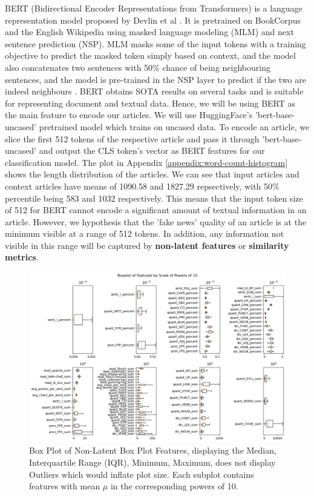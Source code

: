 \documentclass{article}
\begin{document}
\label{section:bert}
BERT (Bidirectional Encoder Representations from Transformers) is a language representation model proposed by Devlin et al \cite{bert}. It is pretrained on BookCorpus and the English Wikipedia using masked language modeling (MLM) and next sentence prediction (NSP). MLM masks some of the input tokens with a training objective to predict the masked token simply based on context, and the model also concatenates two sentences with 50\% chance of being neighbouring sentences, and the model is pre-trained in the NSP layer to predict if the two are indeed neighbours \cite{bert}. BERT obtains SOTA results on several tasks and is suitable for representing document and textual data. Hence, we will be using BERT as the main feature to encode our articles. We will use HuggingFace's 'bert-base-uncased' pretrained model which trains on uncased data. To encode an article, we slice the first 512 tokens of the respective article and pass it through 'bert-base-uncased' and output the CLS token's vector as BERT features for our classification model. The plot in Appendix \ref{appendix:word-count-histogram} shows the length distribution of the articles. We can see that input articles and context articles have means of 1090.58 and 1827.29 repsectively, with 50\% percentile being 583 and 1032 respectively. This means that the input token size of 512 for BERT cannot encode a significant amount of textual information in an article. However, we hypothesis that the 'fake news' quality of an article is at the minimum visible at a range of 512 tokens. In addition, any information not visible in this range will be captured by \textbf{non-latent features} or \textbf{similarity metrics}.

 \label{section:non-latent-feat}

\begin{figure}[h]
  \centering
  \includegraphics[width=\textwidth]{img/non_latent_box_plot.png}
  \caption{Box Plot of Non-Latent Box Plot Features, displaying the Median, Interquartile Range (IQR), Minimum, Maximum, does not display Outliers which would inflate plot size. Each subplot contains features with mean $\mu$ in the corresponding powers of 10.}
  \label{box-plot}
\end{figure}
\end{document}

